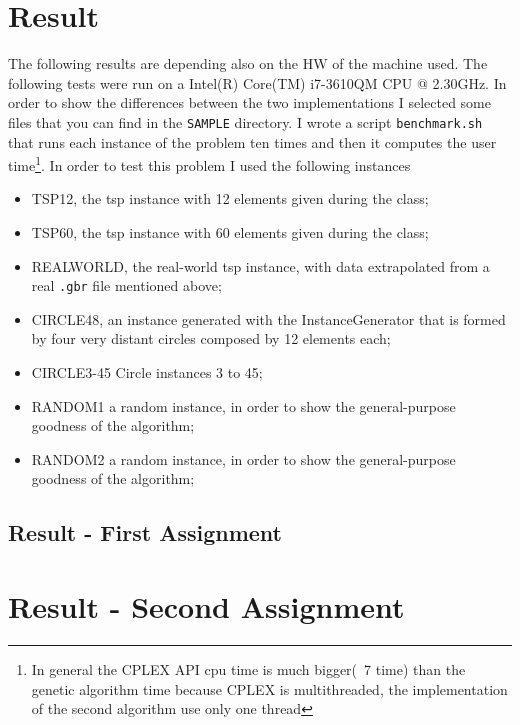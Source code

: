 \section{Result}
The following results are depending also on the HW of the machine used.
The following tests were run on a  Intel(R) Core(TM) i7-3610QM CPU @ 2.30GHz.
In order to show the differences between the two implementations I selected some files
that you can find in the \verb|SAMPLE| directory.
I wrote a script \verb|benchmark.sh| that runs
each instance of the problem ten times and then it computes the
user time\footnote{In general the CPLEX API cpu time is much bigger(~7 time) than the genetic algorithm time
because CPLEX is multithreaded, the implementation of the second algorithm use only one thread}.
In order to test this problem I used the 
following instances 
\begin{itemize}
	\item TSP12, the tsp instance with 12 elements given during the class;
	\item TSP60, the tsp instance with 60 elements given during the class;
	\item REALWORLD, the real-world tsp instance, with data extrapolated from a real
	\verb|.gbr| file mentioned above;
	\item CIRCLE48, an instance generated with the InstanceGenerator that is formed by
	four very distant circles composed by 12 elements each;
	\item CIRCLE3-45 Circle instances 3 to 45;
	\item RANDOM1 a random instance, in order to show the general-purpose goodness of the algorithm;
	\item RANDOM2 a random instance, in order to show the general-purpose goodness of the algorithm;
\end{itemize}

\subsection{Result - First Assignment}




\section{Result - Second Assignment}